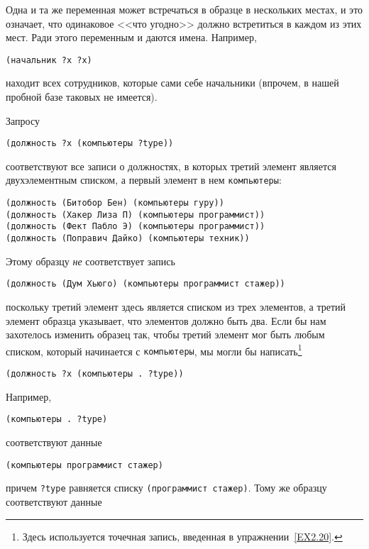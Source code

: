 Одна и та же переменная может встречаться в образце в нескольких местах,
и это означает, что одинаковое <<что угодно>> должно
встретиться в каждом из этих мест.  Ради этого переменным и даются
имена.  Например,

\begin{Verbatim}[fontsize=\small]
(начальник ?x ?x)
\end{Verbatim}
находит всех сотрудников, которые сами себе начальники (впрочем, в
нашей пробной базе таковых не имеется).

Запросу

\begin{Verbatim}[fontsize=\small]
(должность ?x (компьютеры ?type))
\end{Verbatim}
соответствуют все записи о должностях, в которых третий элемент
является двухэлементным списком, а первый элемент в нем
{\tt компьютеры}:

\begin{Verbatim}[fontsize=\small]
(должность (Битобор Бен) (компьютеры гуру))
(должность (Хакер Лиза П) (компьютеры программист))
(должность (Фект Пабло Э) (компьютеры программист))
(должность (Поправич Дайко) (компьютеры техник))
\end{Verbatim}
Этому образцу {\em не} соответствует запись

\begin{Verbatim}[fontsize=\small]
(должность (Дум Хьюго) (компьютеры программист стажер))
\end{Verbatim}
поскольку третий элемент здесь является списком из трех элементов, а
третий элемент образца указывает, что элементов должно быть
два. Если
бы нам захотелось изменить образец так, чтобы третий элемент мог быть
любым списком, который начинается с {\tt компьютеры}, мы могли
бы написать\footnote{Здесь используется точечная запись, введенная в
упражнении~\ref{EX2.20}.}

\begin{Verbatim}[fontsize=\small]
(должность ?x (компьютеры . ?type))
\end{Verbatim}
Например,

\begin{Verbatim}[fontsize=\small]
(компьютеры . ?type)
\end{Verbatim}
соответствуют данные

\begin{Verbatim}[fontsize=\small]
(компьютеры программист стажер)
\end{Verbatim}
причем {\tt ?type} равняется списку  {\tt (программист стажер)}.  Тому
же образцу соответствуют данные

